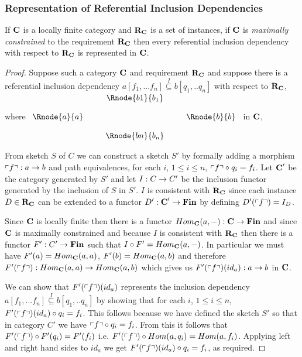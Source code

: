 \documentclass[10pt,a4paper]{article}
\theoremstyle{remark}
\renewcommand{\term}[1]{\textit{#1}}  %
\begin{document}
\subsubsection{Representation of Referential Inclusion Dependencies}
\begin{lemma}
\label{catincdsrepresented}
If $\textbf{C}$ is a locally finite category and $\textbf{R}_{\textbf{C}}$ is a set of instances, if $\textbf{C}$ is 
\term{maximally constrained} to the requirement $\textbf{R}_{\textbf{C}}$ then
every referential inclusion dependency with respect to $\textbf{R}_{\textbf{C}}$ is represented in $\textbf{C}$.
\end{lemma}
\begin{proof}
Suppose such  a category $\textbf{C}$ and  requirement $\textbf{R}_{\textbf{C}}$ 
 and suppose there is a referential inclusion dependency
$a[f_1,...f_n] \overset{I}{\subseteq} b[q_1,..q_n]$ with respect to $\textbf{R}_{\textbf{C}}$,
where
$
\begin{array}{c p{0.25cm} c  p{0.25cm} c }
             &&   \Rnode{b1}{b_1} &&              \\[0.4cm]
\Rnode{a}{a} &&                   && \Rnode{b}{b} \\[0.4cm]
             &&   \Rnode{bn}{b_n} &&              
\end{array} 
$
in $\textbf{C}$, 

From sketch $S$ of $C$ we can construct a sketch $S'$ by formally adding a morphism $\left\ulcorner f\right\urcorner: a \rightarrow b$
and path equivalences, for each $i$, $1 \leq i \leq n$, $\left\ulcorner f\right\urcorner \circ q_i = f_i$. Let $\textbf{C}'$ be the category generated by $S'$ and
let $I: C \rightarrow C'$ be the inclusion functor generated by the inclusion of $S$ in $S'$. $I$ is consistent with $\textbf{R}_{\textbf{C}}$ since
each instance $D \in  \textbf{R}_{\textbf{C}}$ can be extended to a functor $D': \textbf{C}' \rightarrow \textbf{Fin}$ by defining $D'(\left\ulcorner f\right\urcorner)=I_D$.

Since $\textbf{C}$ is locally finite then there is a functor $Hom_{\textbf{C}}(a,-): \textbf{C} \rightarrow \textbf{Fin}$ and since $\textbf{C}$ is maximally constrained and because $I$ is consistent with $\textbf{R}_{\textbf{C}}$ then there is a functor $F': C' \rightarrow \textbf{Fin}$
such that $I \circ F' = Hom_{\textbf{C}}(a,-)$. In particular we must have 
$F'(a)=Hom_{\textbf{C}}(a,a)$,
$F'(b)=Hom_{\textbf{C}}(a,b)$ and therefore $F'(\left\ulcorner f\right\urcorner):Hom_{\textbf{C}}(a,a) \rightarrow Hom_{\textbf{C}}(a,b)$ which gives us
$F'(\left\ulcorner f\right\urcorner)(id_a): a \rightarrow b$ in $\textbf{C}$. 

We can show that $F'(\left\ulcorner f\right\urcorner)(id_a)$ represents
the inclusion dependency $a[f_1,...f_n] \overset{I}{\subseteq} b[q_1,..q_n]$ by showing that for 
each $i$, $1 \leq i \leq n$, $F'(\left\ulcorner f\right\urcorner)(id_a) \circ q_i = f_i$. This follows because we have defined
the sketch $S'$ so that in category $C'$ we have $\left\ulcorner f\right\urcorner \circ q_i = f_i$. From this it follows
that $F'(\left\ulcorner f\right\urcorner) \circ F'(q_i) = F'(f_i)$ i.e. $F'(\left\ulcorner f\right\urcorner) \circ Hom(a,q_i) = Hom(a,f_i)$. 
Applying left and right hand sides to $id_a$ we get $F'(\left\ulcorner f\right\urcorner)(id_a) \circ q_i = f_i$, as required.
\end{proof}
\end{document}
